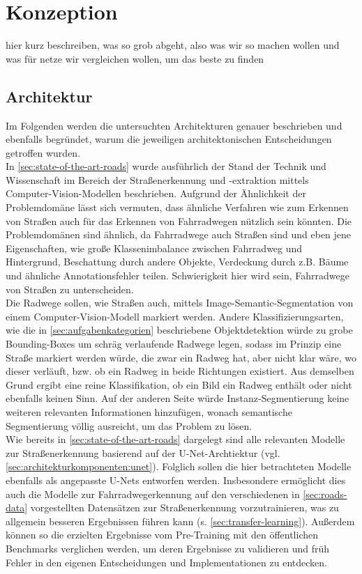 \chapter{Konzeption} %

hier kurz beschreiben, was so grob abgeht, also was wir so machen wollen und was für netze wir vergleichen wollen,
um das beste zu finden

\section{Architektur}

Im Folgenden werden die untersuchten Architekturen genauer beschrieben und ebenfalls begründet, 
warum die jeweiligen architektonischen Entscheidungen getroffen wurden. \\
In \autoref{sec:state-of-the-art-roads} wurde ausführlich der Stand der Technik und Wissenschaft 
im Bereich der Straßenerkennung und -extraktion mittels Computer-Vision-Modellen beschrieben. 
Aufgrund der Ähnlichkeit der Problemdomäne lässt sich vermuten, dass ähnliche Verfahren wie 
zum Erkennen von Straßen auch für das Erkennen von Fahrradwegen nützlich sein könnten. 
Die Problemdomänen sind ähnlich, da Fahrradwege auch Straßen sind und eben jene Eigenschaften, 
wie große Klassenimbalance zwischen Fahrradweg und Hintergrund, Beschattung durch andere Objekte,
Verdeckung durch z.B. Bäume und ähnliche Annotationsfehler   
teilen. Schwierigkeit hier wird sein, Fahrradwege von Straßen zu unterscheiden. \\
Die Radwege sollen, wie Straßen auch, mittels Image-Semantic-Segmentation von einem Computer-Vision-Modell 
markiert werden. Andere Klassifizierungsarten, wie die in \autoref{sec:aufgabenkategorien} beschriebene 
Objektdetektion würde zu grobe Bounding-Boxes um schräg verlaufende Radwege legen, sodass im Prinzip 
eine Straße markiert werden würde, die zwar ein Radweg hat, aber nicht klar wäre, wo dieser verläuft, 
bzw. ob ein Radweg in beide Richtungen existiert. Aus demselben Grund ergibt eine reine Klassifikation, 
ob ein Bild ein Radweg enthält oder nicht ebenfalls keinen Sinn. 
Auf der anderen Seite würde Instanz-Segmentierung keine weiteren relevanten Informationen hinzufügen, 
wonach semantische Segmentierung völlig ausreicht, um das Problem zu lösen. \\
Wie bereits in \autoref{sec:state-of-the-art-roads} dargelegt sind alle relevanten Modelle zur 
Straßenerkennung basierend auf der U-Net-Archtiektur (vgl. \ref{sec:architekturkomponenten:unet}).
Folglich sollen die hier betrachteten Modelle ebenfalls als angepasste U-Nets entworfen werden. 
Insbesondere ermöglicht dies auch die Modelle zur Fahrradwegerkennung auf den verschiedenen 
in \autoref{sec:roads-data} vorgestellten Datensätzen zur Straßenerkennung vorzutrainieren, 
was zu allgemein besseren Ergebnissen führen kann (s. \autoref{sec:transfer-learning}). 
Außerdem können so die erzielten Ergebnisse vom Pre-Training mit den öffentlichen Benchmarks verglichen werden,
um deren Ergebnisse zu validieren und früh Fehler in den eigenen Entscheidungen und Implementationen zu entdecken.

